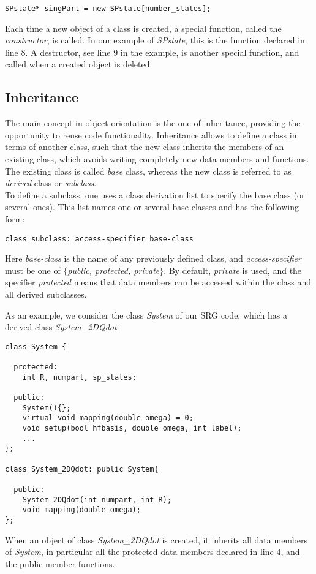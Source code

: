 \begin{lstlisting}[backgroundcolor=\color{lighter-gray}, numbers=none]
SPstate* singPart = new SPstate[number_states];
\end{lstlisting}

Each time a new object of a class is created, a special function, called the \textit{constructor}, is called. In our example of \textit{SPstate}, this is the function declared in line 8.  A destructor, see line 9 in the example, is another special function, and called when a created object is deleted.

\subsection{Inheritance}
The main concept in object-orientation is the one of inheritance, providing the opportunity to reuse  code functionality. Inheritance allows to define a class in terms of another class, such that the new class inherits the members of an existing class, which avoids writing completely new data members and functions. The existing class is called \textit{base} class, whereas the new class is referred to as \textit{derived} class or \textit{subclass}.\\
To define a subclass, one uses a class derivation list to specify the base class (or several ones). This list names one or several base classes and has the following form:

\begin{lstlisting}[backgroundcolor=\color{lighter-gray}, numbers=none]
class subclass: access-specifier base-class
\end{lstlisting}
Here \textit{base-class} is the name of any previously defined class, and \textit{access-specifier} must be one of $\lbrace$\textit{public, protected, private}$\rbrace$. By default, \textit{private} is used, and the specifier \textit{protected} means that data members can be accessed within the class and all derived subclasses.

As an example, we consider the class \textit{System} of our SRG code, which has a derived class \textit{System\_2DQdot}:
\begin{lstlisting}[backgroundcolor=\color{lighter-gray}]
class System {

  protected:
    int R, numpart, sp_states;

  public:   
    System(){};
    virtual void mapping(double omega) = 0;
    void setup(bool hfbasis, double omega, int label);
    ...
};
    
class System_2DQdot: public System{ 
    
  public:
    System_2DQdot(int numpart, int R);
    void mapping(double omega);
};
\end{lstlisting}
When an object of class \textit{System\_2DQdot} is created, it inherits all data members of \textit{System}, in particular all the protected data members declared in line 4, and the public member functions. 

